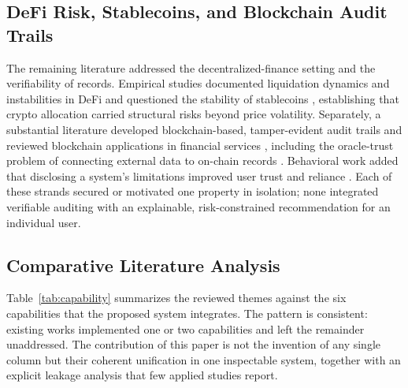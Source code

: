 \subsection{DeFi Risk, Stablecoins, and Blockchain Audit Trails}\label{subsec:defi}
The remaining literature addressed the decentralized-finance setting and the
verifiability of records. Empirical studies documented liquidation dynamics and
instabilities in DeFi \cite{ref5} and questioned the stability of stablecoins
\cite{ref6}, establishing that crypto allocation carried structural risks beyond price
volatility. Separately, a substantial literature developed blockchain-based,
tamper-evident audit trails and reviewed blockchain applications in financial services
\cite{ref13,ref16,ref22}, including the oracle-trust problem of connecting external data
to on-chain records \cite{ref14,ref15}. Behavioral work added that disclosing a
system's limitations improved user trust and reliance \cite{ref11,ref17}. Each of these
strands secured or motivated one property in isolation; none integrated verifiable
auditing with an explainable, risk-constrained recommendation for an individual user.

\subsection{Comparative Literature Analysis}\label{subsec:comparative}
Table~\ref{tab:capability} summarizes the reviewed themes against the six capabilities
that the proposed system integrates. The pattern is consistent: existing works
implemented one or two capabilities and left the remainder unaddressed. The contribution
of this paper is not the invention of any single column but their coherent unification
in one inspectable system, together with an explicit leakage analysis that few applied
studies report.

